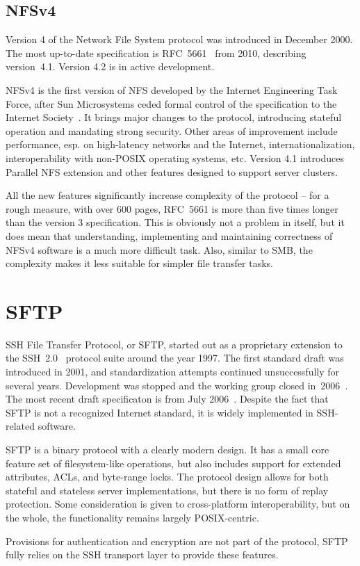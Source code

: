 \subsection{NFSv4}

Version 4 of the Network File System protocol was introduced in December 2000. The most up-to-date
specification is RFC~5661~\cite{rfc5661} from 2010, describing version~4.1. Version 4.2 is in active
development.

NFSv4 is the first version of NFS developed by the Internet Engineering Task Force, after Sun Microsystems
ceded formal control of the specification to the Internet Society~\cite{rfc2339}. It brings major changes to
the protocol, introducing stateful operation and mandating strong security. Other areas of improvement include
performance, esp. on high-latency networks and the Internet, internationalization, interoperability with
non-POSIX operating systems, etc. Version 4.1 introduces Parallel NFS extension and other features designed to
support server clusters.

All the new features significantly increase complexity of the protocol -- for a rough measure, with over 600
pages, RFC~5661 is more than five times longer than the version 3 specification. This is obviously not
a problem in itself, but it does mean that understanding, implementing and maintaining correctness of NFSv4
software is a much more difficult task. Also, similar to SMB, the complexity makes it less suitable for
simpler file transfer tasks.

\section{SFTP}

SSH File Transfer Protocol, or SFTP, started out as a proprietary extension to the SSH~2.0~\cite{rfc4251}
protocol suite around the year 1997. The first standard draft was introduced in 2001, and standardization
attempts continued unsuccessfully for several years. Development was stopped and the working group closed
in~2006~\cite{secsh-email}. The most recent draft specificaton is from July 2006~\cite{draft-secsh-13}.
Despite the fact that SFTP is not a recognized Internet standard, it is widely implemented in SSH-related
software.

SFTP is a binary protocol with a clearly modern design. It has a small core feature set of filesystem-like
operations, but also includes support for extended attributes, ACLs, and byte-range locks.  The protocol
design allows for both stateful and stateless server implementations, but there is no form of replay
protection. Some consideration is given to cross-platform interoperability, but on the whole, the
functionality remains largely POSIX-centric.

Provisions for authentication and encryption are not part of the protocol, SFTP fully relies on the SSH
transport layer to provide these features.
